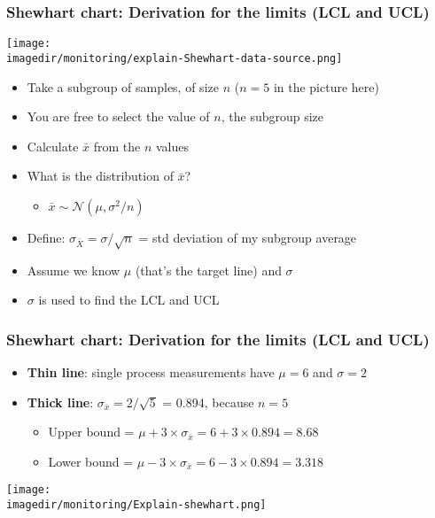 \begin{frame}\frametitle{Shewhart chart: Derivation for the limits (LCL and UCL)}
	\begin{center}
		\texttt{[image: \\imagedir/monitoring/explain-Shewhart-data-source.png]}
	\end{center}
	
	\begin{itemize}
		\item	Take a subgroup of samples, of size $n$ {\small ($n=5$ in the picture here)}
		\item	You are free to select the value of $n$, the subgroup size
		\item	Calculate $\bar{x}$ from the $n$ values
		\item	What is the distribution of $\bar{x}$?
		\begin{itemize}
			\item	$\bar{x} \sim \mathcal{N}(\mu, \sigma^2/n)$
		\end{itemize}
		\item	Define: $\sigma_{\bar{X}} = \sigma/\sqrt{n}$ = std deviation of my subgroup average
		\item	Assume we know $\mu$ (that's the target line) and $\sigma$
		\item	$\sigma$ is used to find the LCL and UCL
	\end{itemize}
\end{frame}

\begin{frame}\frametitle{Shewhart chart: Derivation for the limits (LCL and UCL)}
	\begin{itemize}
		\item	\textbf{Thin line}: single process measurements have $\mu = 6$ and $\sigma = 2$
		\item	\textbf{Thick line}: $\sigma_{\overline{x}} = 2/\sqrt{5}$ = 0.894, because $n=5$
		\begin{itemize}
			\item	Upper bound = $\mu + 3 \times \sigma_{\overline{x}} = 6 + 3\times 0.894 = 8.68$
			\item	Lower bound = $\mu - 3 \times \sigma_{\overline{x}} = 6 - 3\times 0.894 = 3.318$
		\end{itemize}
	\end{itemize}

	\begin{center}
		\texttt{[image: \\imagedir/monitoring/Explain-shewhart.png]}
	\end{center}
\end{frame}

